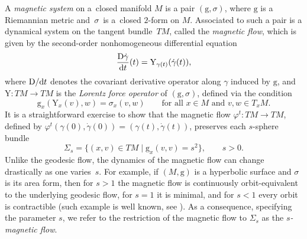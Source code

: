\documentclass[pdftex]{sigma}
\newcommand{\g}{\mathrm{g}}
\newcommand{\Y}{\mathrm{Y}}
\numberwithin{equation}{section}
\theoremstyle{definition}
\begin{document}
A \emph{magnetic system} on a~closed manifold $M$ is a pair $(\g,\sigma)$, where $\g$ is a Riemannian metric and~$\sigma$~is a~closed $2$-form on $M$. Associated to such a pair is a dynamical system on the tangent bundle~$TM$, called the \emph{magnetic flow}, which is given by the second-order nonhomogeneous differential equation
\begin{equation} \label{eqn:magnetic-geodesic} \frac{{\rm D} \dot{\gamma}}{{\rm d}t}(t) = \Y_{\gamma(t)}(\dot{\gamma}(t)),\end{equation}
where ${\rm D}/{\rm d}t$ denotes the covariant derivative operator along $\gamma$ induced by $\g$, and $\Y\colon TM\to TM$ is the \emph{Lorentz force operator} of $(\g,\sigma)$, defined via the condition
\begin{equation}\label{Lorentz-force} \g_x(\Y_x(v), w) = \sigma_x(v,w) \qquad\text{for all } x\in M\mbox{ and } v,w\in T_xM.\end{equation}
It is a straightforward exercise to show that the magnetic flow $\varphi^t\colon TM\to TM$, defined by \mbox{$\varphi^t(\gamma(0), \dot{\gamma}(0)) = (\gamma(t), \dot{\gamma}(t))$}, preserves each $s$-sphere bundle \begin{equation}\label{defn-Sigma_s}
 \Sigma_s = \bigl\{(x,v) \in TM \mid \g_x(v,v) = s^2\bigr\},\qquad s>0.
\end{equation}
Unlike the geodesic flow, the dynamics of the magnetic flow can change drastically as one varies~$s$. For example, if $(M,\g)$ is a hyperbolic surface and $\sigma$ is its area form, then for $s > 1$ the magnetic flow is continuously orbit-equivalent to the underlying geodesic flow, for $s = 1$ it is minimal, and for $s < 1$ every orbit is contractible (such example is well known, see \cite{paternain2006magnetic}). As a consequence, specifying the parameter $s$, we refer to the restriction of the magnetic flow to $\Sigma_s$ as the \emph{$s$-magnetic flow}.
\end{document}
